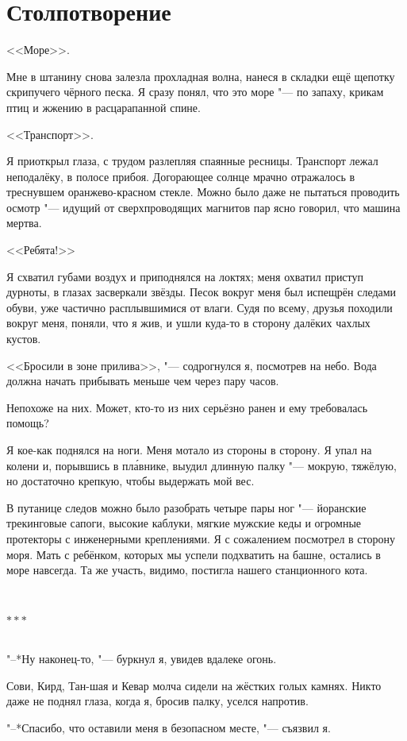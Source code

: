 \documentclass[a4paper,12pt,fleqn]{book}
\newcommand{\razd}{~\\{\centering\Large\bfseries$\ast \ast \ast$\par}~\\}
\begin{document}
\chapter*{Столпотворение}

<<Море>>.

Мне в штанину снова залезла прохладная волна, нанеся в складки ещё щепотку скрипучего чёрного песка.
Я сразу понял, что это море "--- по запаху, крикам птиц и жжению в расцарапанной спине.

<<Транспорт>>.

Я приоткрыл глаза, с трудом разлепляя спаянные ресницы.
Транспорт лежал неподалёку, в полосе прибоя.
Догорающее солнце мрачно отражалось в треснувшем оранжево-красном стекле.
Можно было даже не пытаться проводить осмотр "--- идущий от сверхпроводящих магнитов пар ясно говорил, что машина мертва.

<<Ребята!>>

Я схватил губами воздух и приподнялся на локтях;
меня охватил приступ дурноты, в глазах засверкали звёзды.
Песок вокруг меня был испещрён следами обуви, уже частично расплывшимися от влаги.
Судя по всему, друзья походили вокруг меня, поняли, что я жив, и ушли куда-то в сторону далёких чахлых кустов.

<<Бросили в зоне прилива>>, "--- содрогнулся я, посмотрев на небо.
Вода должна начать прибывать меньше чем через пару часов.

Непохоже на них.
Может, кто-то из них серьёзно ранен и ему требовалась помощь?

Я кое-как поднялся на ноги.
Меня мотало из стороны в сторону.
Я упал на колени и, порывшись в пл\'{а}внике, выудил длинную палку "--- мокрую, тяжёлую, но достаточно крепкую, чтобы выдержать мой вес.

В путанице следов можно было разобрать четыре пары ног "--- йоранские трекинговые сапоги, высокие каблуки, мягкие мужские кеды и огромные протекторы с инженерными креплениями.
Я с сожалением посмотрел в сторону моря.
Мать с ребёнком, которых мы успели подхватить на башне, остались в море навсегда.
Та же участь, видимо, постигла нашего станционного кота.

\razd

"--*Ну наконец-то, "--- буркнул я, увидев вдалеке огонь.

Сови, Кирд, Тан-шая и Кевар молча сидели на жёстких голых камнях.
Никто даже не поднял глаза, когда я, бросив палку, уселся напротив.

"--*Спасибо, что оставили меня в безопасном месте, "--- съязвил я.
\end{document}
